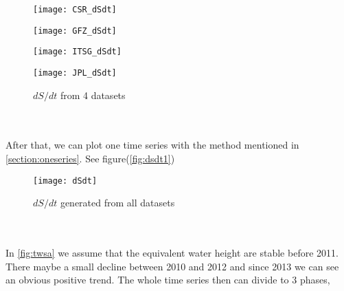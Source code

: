 \begin{figure}[htbp]\label{fig:dSdt}
	\centering
	\begin{minipage}[t]{0.45\textwidth}
		\centering
		\texttt{[image: CSR\_dSdt]} %
		\label{fig:CSRdS}
	\end{minipage}
	\begin{minipage}[t]{0.45\textwidth}
		\centering
		\texttt{[image: GFZ\_dSdt]} %
		\label{fig:GFZdS}
	\end{minipage}
	\begin{minipage}[t]{0.45\textwidth}
		\centering
		\texttt{[image: ITSG\_dSdt]} %
		\label{fig:ITSGdS}
	\end{minipage}
	\begin{minipage}[t]{0.45\textwidth}
		\centering
		\texttt{[image: JPL\_dSdt]} %
		\label{fig:JPLdS}
	\end{minipage}
	\caption{$dS / dt$ from 4 datasets}
\end{figure}
\\\\
After that, we can plot one time series with the method mentioned in \ref{section:oneseries}. See figure(\ref{fig:dsdt1})
\begin{figure}[htbp]\label{fig:dsdt1} 
	\centering
	\texttt{[image: dSdt]} %
	\caption{$dS/dt$ generated from all datasets} 
	\label{fig:onetimeserie}
\end{figure}
\\\\
In \ref{fig:twsa} we assume that the equivalent water height are stable before 2011. There maybe a small decline between 2010 and 2012 and since 2013 we can see an obvious positive trend. The whole time series then can divide to 3 phases, 